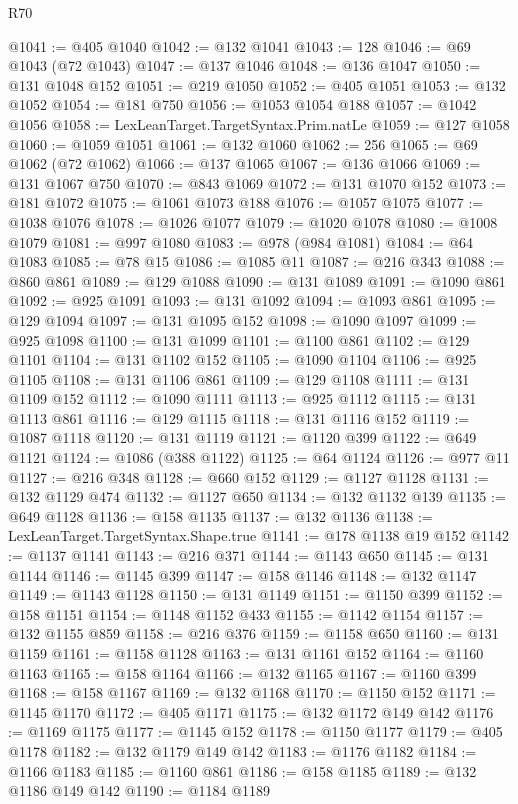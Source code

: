 \begin{lexlean}{R70}
\begin{coremodule}
@1041 := @405 @1040
@1042 := @132 @1041
@1043 := 128
@1046 := @69 @1043 (@72 @1043)
@1047 := @137 @1046
@1048 := @136 @1047
@1050 := @131 @1048 @152
@1051 := @219 @1050
@1052 := @405 @1051
@1053 := @132 @1052
@1054 := @181 @750
@1056 := @1053 @1054 @188
@1057 := @1042 @1056
@1058 := LexLeanTarget.TargetSyntax.Prim.natLe
@1059 := @127 @1058
@1060 := @1059 @1051
@1061 := @132 @1060
@1062 := 256
@1065 := @69 @1062 (@72 @1062)
@1066 := @137 @1065
@1067 := @136 @1066
@1069 := @131 @1067 @750
@1070 := @843 @1069
@1072 := @131 @1070 @152
@1073 := @181 @1072
@1075 := @1061 @1073 @188
@1076 := @1057 @1075
@1077 := @1038 @1076
@1078 := @1026 @1077
@1079 := @1020 @1078
@1080 := @1008 @1079
@1081 := @997 @1080
@1083 := @978 (@984 @1081)
@1084 := @64 @1083
@1085 := @78 @15
@1086 := @1085 @11
@1087 := @216 @343
@1088 := @860 @861
@1089 := @129 @1088
@1090 := @131 @1089
@1091 := @1090 @861
@1092 := @925 @1091
@1093 := @131 @1092
@1094 := @1093 @861
@1095 := @129 @1094
@1097 := @131 @1095 @152
@1098 := @1090 @1097
@1099 := @925 @1098
@1100 := @131 @1099
@1101 := @1100 @861
@1102 := @129 @1101
@1104 := @131 @1102 @152
@1105 := @1090 @1104
@1106 := @925 @1105
@1108 := @131 @1106 @861
@1109 := @129 @1108
@1111 := @131 @1109 @152
@1112 := @1090 @1111
@1113 := @925 @1112
@1115 := @131 @1113 @861
@1116 := @129 @1115
@1118 := @131 @1116 @152
@1119 := @1087 @1118
@1120 := @131 @1119
@1121 := @1120 @399
@1122 := @649 @1121
@1124 := @1086 (@388 @1122)
@1125 := @64 @1124
@1126 := @977 @11
@1127 := @216 @348
@1128 := @660 @152
@1129 := @1127 @1128
@1131 := @132 @1129 @474
@1132 := @1127 @650
@1134 := @132 @1132 @139
@1135 := @649 @1128
@1136 := @158 @1135
@1137 := @132 @1136
@1138 := LexLeanTarget.TargetSyntax.Shape.true
@1141 := @178 @1138 @19 @152
@1142 := @1137 @1141
@1143 := @216 @371
@1144 := @1143 @650
@1145 := @131 @1144
@1146 := @1145 @399
@1147 := @158 @1146
@1148 := @132 @1147
@1149 := @1143 @1128
@1150 := @131 @1149
@1151 := @1150 @399
@1152 := @158 @1151
@1154 := @1148 @1152 @433
@1155 := @1142 @1154
@1157 := @132 @1155 @859
@1158 := @216 @376
@1159 := @1158 @650
@1160 := @131 @1159
@1161 := @1158 @1128
@1163 := @131 @1161 @152
@1164 := @1160 @1163
@1165 := @158 @1164
@1166 := @132 @1165
@1167 := @1160 @399
@1168 := @158 @1167
@1169 := @132 @1168
@1170 := @1150 @152
@1171 := @1145 @1170
@1172 := @405 @1171
@1175 := @132 @1172 @149 @142
@1176 := @1169 @1175
@1177 := @1145 @152
@1178 := @1150 @1177
@1179 := @405 @1178
@1182 := @132 @1179 @149 @142
@1183 := @1176 @1182
@1184 := @1166 @1183
@1185 := @1160 @861
@1186 := @158 @1185
@1189 := @132 @1186 @149 @142
@1190 := @1184 @1189

\end{coremodule}
\end{lexlean}
